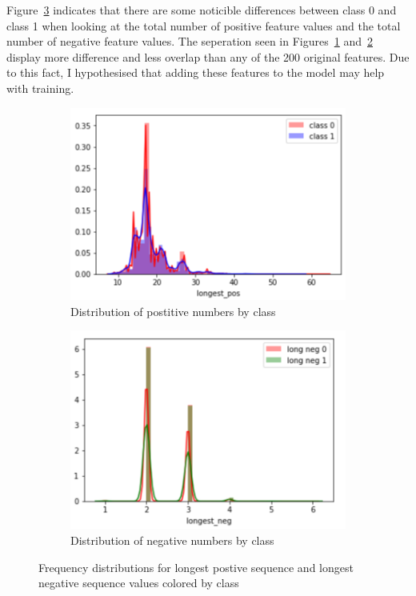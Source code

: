 \documentclass[11pt,letterpaper]{article}
\begin{document}
Figure~\ref{fig:count_dist} indicates that there are some noticible differences
between class 0 and class 1 when looking at the total number of positive feature
values and the total number of negative feature values. The seperation seen in
Figures~\ref{fig:pos_dist} and~\ref{fig:neg_dist} display more difference and
less overlap than any of the 200 original features.  Due to this fact, I
hypothesised that adding these features to the model may help with training. 

\begin{figure}[h!]
    \centering
    \begin{subfigure}[]{.4\textwidth}
        \includegraphics[width=\textwidth]{long_pos_dist.png}
        \caption{Distribution of postitive numbers by class}
        \label{fig:pos_dist}
    \end{subfigure}
    \begin{subfigure}[]{.4\textwidth}
        \includegraphics[width=\textwidth]{long_neg_dist.png}
        \caption{Distribution of negative numbers by class}
        \label{fig:neg_dist}
    \end{subfigure}
    \caption{Frequency distributions for longest postive sequence and longest
negative sequence values colored by class}
    \label{fig:count_dist}
\end{figure}
\end{document}

